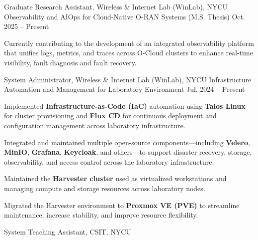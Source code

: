 
\begin{cventries}

    \cventry
    {Graduate Research Assistant, Wireless \& Internet Lab (WinLab), NYCU} %
    {Observability and AIOps for Cloud-Native O-RAN Systems (M.S. Thesis)} %
    {} %
    {Oct. 2025 -- Present} %
    {
      \begin{cvitems}
        \item {Currently contributing to the development of an integrated observability platform that unifies logs, metrics, and traces across O-Cloud clusters to enhance real-time visibility, fault diagnosis and fault recovery.} 
      \end{cvitems}
    }
  \cventry
  {System Administrator, Wireless \& Internet Lab (WinLab), NYCU} %
  {Infrastructure Automation and Management for Laboratory Environment} %
  {} %
  {Jul. 2024 -- Present} %
  {
    \begin{cvitems}
      \item {Implemented \textbf{Infrastructure-as-Code (IaC)} automation using \textbf{Talos Linux} for cluster provisioning and \textbf{Flux CD} for continuous deployment and configuration management across laboratory infrastructure.}
      \item {Integrated and maintained multiple open-source components—including \textbf{Velero}, \textbf{MinIO}, \textbf{Grafana}, \textbf{Keycloak}, and others—to support disaster recovery, storage, observability, and access control across the laboratory infrastructure.}
      \item {Maintained the \textbf{Harvester cluster} used as virtualized workstations and managing compute and storage resources across laboratory nodes.}
      \item {Migrated the Harvester environment to \textbf{Proxmox VE (PVE)} to streamline maintenance, increase stability, and improve resource flexibility.}
    \end{cvitems}
  }
  \cventry
  {System Teaching Assistant, CSIT, NYCU} %

\end{cventries}
